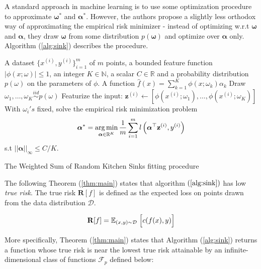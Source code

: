 \documentclass{article}
\DeclareMathOperator*{\argmin}{arg\,min}
\begin{document}
    A standard approach in machine learning is to use some optimization procedure to approximate $\bm{\omega}^*$ and $\bm{\alpha}^*$. However, the authors propose a slightly less orthodox way of approximating the empirical risk minimizer - instead of optimizing w.r.t $\bm{\omega}$ and $\bm{\alpha}$, they draw $\bm{\omega}$ from some distribution $p(\bm{\omega})$ and optimize over $\bm{\alpha}$ only. Algorithm (\ref{alg:sink}) describes the procedure.


    \begin{algorithm}[H]
    	\begin{algorithmic}
    		\REQUIRE A dataset $\{x^{(i)}, y^{(i)}\}_{i=1}^m$ of $m$ points, a bounded feature function $|\phi(x;\omega)|\leq 1$, an integer $K \in \mathbb{N}$, a scalar $C \in \mathbb{R}$ and a probability distribution $p(\omega)$ on the parameters of $\phi$.
    		\ENSURE A function $\hat{f}(x)=\sum_{k=1}^K\phi(x;\omega_k)\alpha_k$
    		\STATE Draw $\omega_1, \dots, \omega_K \overset{iid}{\sim} p(\omega)$
    		\STATE Featurize the input: $\mathbf{z}^{(i)}\leftarrow [\phi(x^{(i)}; \omega_1), \dots, \phi(x^{(i)}; \omega_K)]$
    		\STATE With $\omega_i's$ fixed,  solve the empirical risk minimization problem
    		\begin{equation}
    		    \bm{\alpha}^* =
                \argmin_{\bm{\alpha} \in \reals^K}
                \frac{1}{m}\sum_{i=1}^m l\left(\bm{\alpha}^\top\mathbf{z}^{(i)}, y^{(i)}\right)
    		\end{equation}
    		s.t $||\bm{\alpha}||_{\infty}\leq C / K$.
    	\end{algorithmic}
    	\caption{The Weighted Sum of Random Kitchen Sinks fitting procedure}
    	\label{alg:sink}
    \end{algorithm}

    The following Theorem (\ref{thm:main}) states that algorithm $(\ref{alg:sink})$ has low \textit{true risk}. The true risk $\mathbf{R}[f]$ is defined as the expected loss on points drawn from the data distribution $\mathcal{D}$.

    \begin{equation}
        \mathbf{R}[f] = \mathbb{E}_{(x,y)\sim \mathcal{D}}\; \Big[c(f(x), y)\Big]
    \end{equation}

    More specifically, Theorem (\ref{thm:main}) states that Algorithm (\ref{alg:sink}) returns a function whose true risk is near the lowest true risk attainable by an infinite-dimensional class of functions $\mathcal{F}_p$ defined below:
\end{document}
